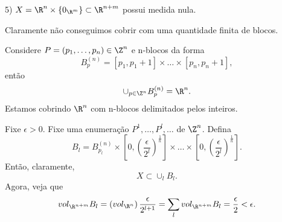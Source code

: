 \begin{eg}
    5) $X =  \R^{n} \times \left\{ 0_{\R^{m}} \right\} \subset \R^{n+m}$ possui medida nula.

    Claramente não conseguimos cobrir com uma quantidade finita de blocos.
    \begin{observe}
	Considere $P = (p_1,\ldots,p_n) \in \Z^{n}$ e n-blocos da forma \[
        B_p^{(n)} = \left[ p_1, p_1+1 \right] \times \ldots\times \left[ p_n, p_n+1 \right] 
        ,\] então \[
        \cup_{p\in \Z^{n}}B_p^{(n)} = \R^{n}
        .\] Estamos cobrindo $\R^{n}$ com n-blocos delimitados pelos inteiros.
    \end{observe}
    Fixe $\epsilon>0$. Fixe uma enumeração $P^{1},\ldots,P^{l},\ldots$ de $\Z^{n}$. Defina \[
    B_l = B^{(n)}_{p_l} \times \left[ 0, \left( \frac{\epsilon}{2^{l}} \right)^{\frac{1}{n}} \right]\times \ldots\times \left[ 0, \left( \frac{\epsilon}{2^{l}} \right)^{\frac{1}{n}} \right]
    .\] Então, claramente, \[
    X \subset  \cup _l B_l
    .\] Agora, veja que \[
    vol_{\R^{n+m}}B_l = \left( vol_{\R^{n}} \right) \frac{\epsilon}{2^{l+1}} = \sum_{l} vol_{\R^{n+m}}B_l = \frac{\epsilon}{2} < \epsilon
    .\] 
\end{eg}


